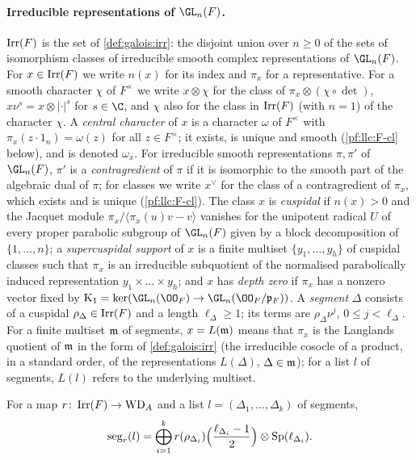 \paragraph{Irreducible representations of $\GL_n(F)$.} $\operatorname{Irr}(F)$ is the set of \cref{def:galois:irr}:
the disjoint union over $n\ge0$ of the sets of isomorphism classes of irreducible smooth complex
representations of $\GL_n(F)$. For $x\in\operatorname{Irr}(F)$ we write $n(x)$ for its index and $\pi_x$ for a
representative. For a smooth character $\chi$ of $F^\times$ we write $x\otimes\chi$ for the class of
$\pi_x\otimes(\chi\circ\det)$, $x\nu^s=x\otimes|\cdot|^s$ for $s\in\C$, and $\chi$ also for the class in
$\operatorname{Irr}(F)$ (with $n=1$) of the character $\chi$. A \emph{central character} of $x$ is a character $\omega$
of $F^\times$ with $\pi_x(z\cdot1_n)=\omega(z)$ for all $z\in F^\times$; it exists, is unique and smooth
(\ref{pf:llc:F-cl} below), and is denoted $\omega_x$. For irreducible smooth representations $\pi,\pi'$ of
$\GL_n(F)$, $\pi'$ is a \emph{contragredient} of $\pi$ if it is isomorphic to the smooth part of the
algebraic dual of $\pi$; for classes we write $x^\vee$ for the class of a contragredient of $\pi_x$,
which exists and is unique (\ref{pf:llc:F-cl}). The class $x$ is \emph{cuspidal} if $n(x)>0$ and the
Jacquet module $\pi_x/\langle\pi_x(u)v-v\rangle$ vanishes for the unipotent radical $U$ of every proper
parabolic subgroup of $\GL_n(F)$ given by a block decomposition of $\{1,\dots,n\}$; a
\emph{supercuspidal support} of $x$ is a finite multiset $\{y_1,\dots,y_h\}$ of cuspidal classes such
that $\pi_x$ is an irreducible subquotient of the normalised parabolically induced representation
$y_1\times\dots\times y_h$; and $x$ has \emph{depth zero} if $\pi_x$ has a nonzero vector fixed by
$\llcK=\ker(\GL_n(\OO_F)\to\GL_n(\OO_F/\llcp_F))$. A \emph{segment} $\Delta$ consists of a cuspidal
$\rho_\Delta\in\operatorname{Irr}(F)$ and a length $\ell_\Delta\ge1$; its terms are $\rho_\Delta\nu^j$, $0\le j<\ell_\Delta$.
For a finite multiset $\mathfrak m$ of segments, $x=L(\mathfrak m)$ means that $\pi_x$ is the Langlands quotient of
$\mathfrak m$ in the form of \cref{def:galois:irr} (the irreducible cosocle of a product, in a standard order,
of the representations $L(\Delta)$, $\Delta\in\mathfrak m$); for a list $l$ of segments, $L(l)$ refers to the
underlying multiset.

\begin{definition}\label{pf:llc:def-seg}
For a map $r\colon\operatorname{Irr}(F)\to\mathrm{WD}_A$ and a list $l=(\Delta_1,\dots,\Delta_k)$ of segments,
\begin{equation}\label{pf:llc:eq-seg}
  \operatorname{seg}_r(l)=\bigoplus_{i=1}^k r(\rho_{\Delta_i})\Bigl(\frac{\ell_{\Delta_i}-1}2\Bigr)\otimes\operatorname{Sp}(\ell_{\Delta_i}).
\end{equation}
\end{definition}

